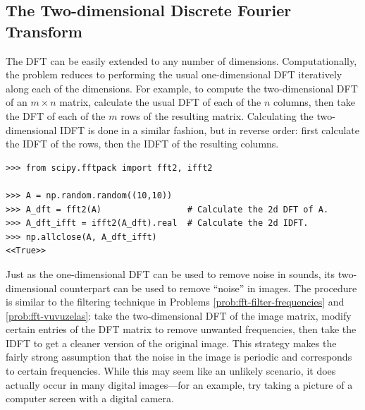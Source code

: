 
\subsection*{The Two-dimensional Discrete Fourier Transform} %

The DFT can be easily extended to any number of dimensions.
Computationally, the problem reduces to performing the usual one-dimensional DFT iteratively along each of the dimensions.
For example, to compute the two-dimensional DFT of an $m \times n$ matrix, calculate the usual DFT of each of the $n$ columns, then take the DFT of each of the $m$ rows of the resulting matrix.
Calculating the two-dimensional IDFT is done in a similar fashion, but in reverse order: first calculate the IDFT of the rows, then the IDFT of the resulting columns.

\begin{lstlisting}
>>> from scipy.fftpack import fft2, ifft2

>>> A = np.random.random((10,10))
>>> A_dft = fft2(A)                 # Calculate the 2d DFT of A.
>>> A_dft_ifft = ifft2(A_dft).real  # Calculate the 2d IDFT.
>>> np.allclose(A, A_dft_ifft)
<<True>>
\end{lstlisting}

Just as the one-dimensional DFT can be used to remove noise in sounds, its two-dimensional counterpart can be used to remove ``noise'' in images.
The procedure is similar to the filtering technique in Problems \ref{prob:fft-filter-frequencies} and \ref{prob:fft-vuvuzelas}: take the two-dimensional DFT of the image matrix, modify certain entries of the DFT matrix to remove unwanted frequencies, then take the IDFT to get a cleaner version of the original image.
This strategy makes the fairly strong assumption that the noise in the image is periodic and corresponds to certain frequencies.
While this may seem like an unlikely scenario, it does actually occur in many digital images---for an example, try taking a picture of a computer screen with a digital camera.

